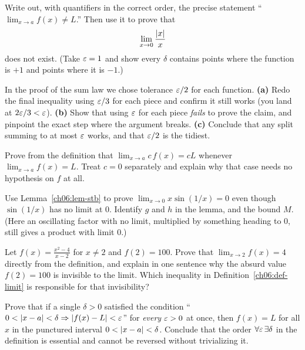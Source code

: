 \begin{exercise}
Write out, with quantifiers in the correct order, the precise statement
``$\lim_{x\to a}f(x)\ne L$.'' Then use it to prove that
\[
  \lim_{x\to 0}\frac{\lvert x\rvert}{x}
\]
does not exist. (Take $\varepsilon=1$ and
show every $\delta$ contains points where the function is $+1$ and points where
it is $-1$.)
\end{exercise}

\begin{exercise}
In the proof of the sum law we chose tolerance $\varepsilon/2$ for each function.
\textbf{(a)} Redo the final inequality using $\varepsilon/3$ for each piece and confirm
it still works (you land at $2\varepsilon/3<\varepsilon$). \textbf{(b)} Show that using $\varepsilon$
for each piece \emph{fails} to prove the claim, and pinpoint the exact step where
the argument breaks. \textbf{(c)} Conclude that any split summing to at most
$\varepsilon$ works, and that $\varepsilon/2$ is the tidiest.
\end{exercise}

\begin{exercise}
Prove from the definition that $\displaystyle\lim_{x\to a}c\,f(x)=cL$ whenever
$\lim_{x\to a}f(x)=L$. Treat $c=0$ separately and explain why that case needs no
hypothesis on $f$ at all.
\end{exercise}

\begin{exercise}
Use Lemma~\ref{ch06:lem-stb} to prove $\displaystyle\lim_{x\to0}x\sin(1/x)=0$
even though $\sin(1/x)$ has no limit at $0$. Identify $g$ and $h$ in the lemma,
and the bound $M$. (Here an oscillating factor with no limit, multiplied by
something heading to $0$, still gives a product with limit $0$.)
\end{exercise}

\begin{exercise}
Let $\displaystyle f(x)=\frac{x^2-4}{x-2}$ for $x\ne2$ and $f(2)=100$. Prove that
$\lim_{x\to2}f(x)=4$ directly from the definition, and explain in one sentence
why the absurd value $f(2)=100$ is invisible to the limit. Which inequality in
Definition~\ref{ch06:def-limit} is responsible for that invisibility?
\end{exercise}

\begin{exercise}
Prove that if a single $\delta>0$ satisfied the condition
``$0<\lvert x-a\rvert<\delta\Rightarrow\lvert f(x)-L\rvert<\varepsilon$'' for \emph{every} $\varepsilon>0$
at once, then $f(x)=L$ for all $x$ in the punctured interval $0<\lvert x-a\rvert<\delta$.
Conclude that the order $\forall\varepsilon\,\exists\delta$ in the definition is
essential and cannot be reversed without trivializing it.
\end{exercise}

